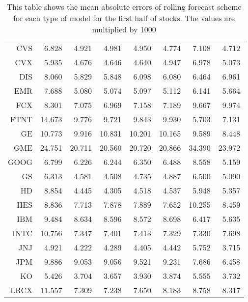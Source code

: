 \begin{table}[ht]
\begin{tabular}{rrrrrrrr}
  CVS & 6.828 & 4.921 & 4.981 & 4.950 & 4.774 & 7.108 & 4.712 \\ 
  CVX & 5.935 & 4.676 & 4.646 & 4.640 & 4.947 & 6.978 & 5.073 \\ 
  DIS & 8.060 & 5.829 & 5.848 & 6.098 & 6.080 & 6.464 & 6.961 \\ 
  EMR & 7.688 & 5.080 & 5.074 & 5.097 & 5.112 & 6.141 & 5.664 \\ 
  FCX & 8.301 & 7.075 & 6.969 & 7.158 & 7.189 & 9.667 & 9.974 \\ 
  FTNT & 14.673 & 9.776 & 9.721 & 9.843 & 9.930 & 5.703 & 7.131 \\ 
  GE & 10.773 & 9.916 & 10.831 & 10.201 & 10.165 & 9.589 & 8.448 \\ 
  GME & 24.751 & 20.711 & 20.560 & 20.720 & 20.866 & 34.390 & 23.972 \\ 
  GOOG & 6.799 & 6.226 & 6.244 & 6.350 & 6.488 & 8.558 & 5.159 \\ 
  GS & 6.313 & 4.581 & 4.508 & 4.735 & 4.887 & 6.500 & 5.090 \\ 
  HD & 8.854 & 4.445 & 4.305 & 4.518 & 4.537 & 5.948 & 5.357 \\ 
  HES & 8.836 & 7.713 & 7.878 & 7.889 & 7.652 & 10.255 & 8.459 \\ 
  IBM & 9.484 & 8.634 & 8.596 & 8.572 & 8.698 & 6.417 & 5.635 \\ 
  INTC & 10.756 & 7.347 & 7.401 & 7.413 & 7.329 & 7.330 & 7.698 \\ 
  JNJ & 4.921 & 4.222 & 4.289 & 4.405 & 4.442 & 5.752 & 3.715 \\ 
  JPM & 9.886 & 9.053 & 9.056 & 9.521 & 9.231 & 7.686 & 6.458 \\ 
  KO & 5.426 & 3.704 & 3.657 & 3.930 & 3.874 & 5.555 & 3.732 \\ 
  LRCX & 11.557 & 7.309 & 7.238 & 7.650 & 8.183 & 8.758 & 8.317 \\ 
   \hline
\end{tabular}
\caption[MAE rolling forecast (1)]{This table shows the mean absolute errors of rolling forecast scheme for each type of model for the first half of stocks. 
                     The values are multiplied by 1000} 
\label{Table:MAE_r_1}
\end{table}
